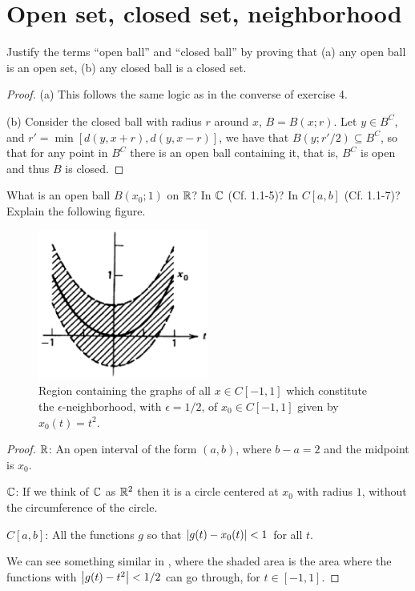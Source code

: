 \section{Open set, closed set, neighborhood}


\begin{exercise}{1}
Justify the terms ``open ball'' and ``closed ball'' by proving that (a) any open ball is an open set, (b) any closed ball is a closed set.
\end{exercise}
\begin{proof}
(a) This follows the same logic as in the converse of exercise 4.

(b) Consider the closed ball with radius $r$ around $x$, $B=B(x;r)$. Let $y\in B^C$, and $r'=\min[d(y,x+r), d(y,x-r)]$, we have that $B(y;r'/2)\subseteq B^C$, so that for any point in $B^C$ there is an open ball containing it, that is, $B^C$ is open and thus $B$ is closed.
\end{proof}

\begin{exercise}{2}
What is an open ball $B(x_0; 1)$ on $\mathbb{R}$? In $\mathbb{C}$ (Cf. 1.1-5)?  In $C[a,b]$ (Cf. 1.1-7)? Explain the following figure.
\begin{figure}[H]
    \centering
    \includegraphics[width=0.5\textwidth]{kreyszig/assets/sec1-3-ex2.png}
    \caption{Region containing the graphs of all $x\in C[-1,1]$ which constitute the $\epsilon$-neighborhood, with $\epsilon=1/2$, of $x_0\in C[-1,1]$ given by $x_0(t)=t^2$.}
    \label{fig:fig1-3}
\end{figure}
\end{exercise}
\begin{proof}
$\mathbb{R}$: An open interval of the form $(a,b)$, where $b-a=2$ and the midpoint is $x_0$.

$\mathbb{C}$: If we think of $\mathbb{C}$ as $\mathbb{R}^2$ then it is a circle centered at $x_0$ with radius $1$, without the circumference of the circle.

$C[a,b]$: All the functions $g$ so that $\left\lvert g(t)-x_0(t)\right\rvert<1$ for all $t$. 

We can see something similar in , where the shaded area is the area where the functions with $\left\lvert g(t)-t^2\right\rvert<1/2$ can go through, for $t\in[-1,1]$.
\end{proof}

